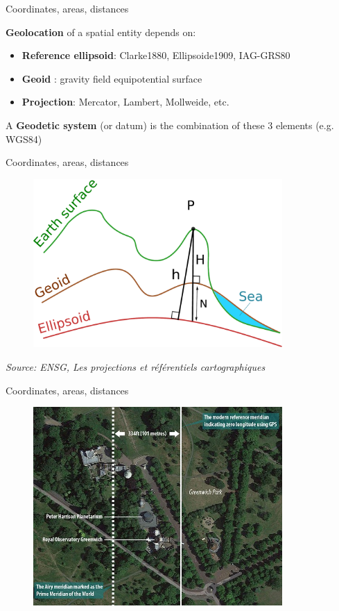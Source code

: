 \begin{frame}{Coordinates, areas, distances}

 \textbf{Geolocation} of a spatial entity  depends on:

\begin{itemize}
  \item \textbf{Reference ellipsoid}: Clarke1880, Ellipsoide1909, IAG-GRS80
  \item \textbf{Geoid} : gravity field equipotential surface 
  \item \textbf{Projection}: Mercator, Lambert, Mollweide, etc.
\end{itemize}

 A \textbf{Geodetic system} (or datum) is the combination of these 3 elements (e.g. WGS84)

\end{frame}

\begin{frame}{Coordinates, areas, distances}

\begin{figure}
\includegraphics[width=9.5cm]{Geoide_EN.pdf}
\end{figure}

\footnotesize
\emph{Source: ENSG, Les projections et référentiels cartographiques}
\normalsize

\end{frame}



\begin{frame}{Coordinates, areas, distances}

\begin{figure}
\includegraphics[width=9.5cm]{Greenwich.jpg}
\end{figure}

\end{frame}


